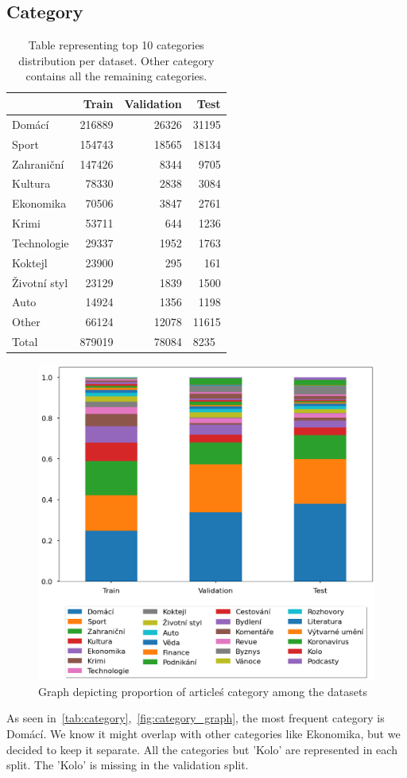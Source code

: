\subsection{Category}
\begin{table}[h]
    \centering\footnotesize\sf
    \begin{tabular}{lrrr}
        \toprule
        {}           & Train  & Validation & Test  \\
        \midrule
        Domácí       & 216889 & 26326      & 31195 \\
        Sport        & 154743 & 18565      & 18134 \\
        Zahraniční   & 147426 & 8344       & 9705  \\
        Kultura      & 78330  & 2838       & 3084  \\
        Ekonomika    & 70506  & 3847       & 2761  \\
        Krimi        & 53711  & 644        & 1236  \\
        Technologie  & 29337  & 1952       & 1763  \\
        Koktejl      & 23900  & 295        & 161   \\
        Životní styl & 23129  & 1839       & 1500  \\
        Auto         & 14924  & 1356       & 1198  \\
        \midrule
        Other        & 66124  & 12078      & 11615 \\
        \midrule
        Total        & 879019 & 78084      & 8235~ \\
        \bottomrule
    \end{tabular}
    \caption{Table representing top 10 categories distribution per dataset. Other category contains all the remaining categories.}
    \label{tab:category}
\end{table}
\begin{figure}[h]
    \centering
    \includegraphics[width=.6\linewidth]{img/tasks_graph/category.png}
    \caption{Graph depicting proportion of article\'s category among the datasets}
    \label{fig:category_graph}
\end{figure}
As seen in~\autoref{tab:category},~\autoref{fig:category_graph}, the most frequent category is Domácí.
We know it might overlap with other categories like Ekonomika, but we decided to keep it separate.
All the categories but 'Kolo' are represented in each split. The 'Kolo' is missing in the validation split.

